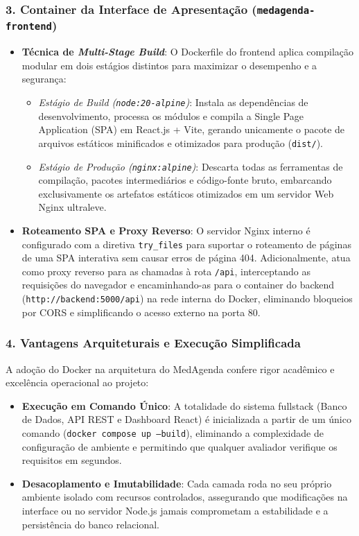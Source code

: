 \subsubsection{3. Container da Interface de Apresentação (\texttt{medagenda-frontend})}
\begin{itemize}
    \item \textbf{Técnica de \textit{Multi-Stage Build}}: O Dockerfile do frontend aplica compilação modular em dois estágios distintos para maximizar o desempenho e a segurança:
    \begin{itemize}
        \item \textit{Estágio de Build (\texttt{node:20-alpine})}: Instala as dependências de desenvolvimento, processa os módulos e compila a Single Page Application (SPA) em React.js + Vite, gerando unicamente o pacote de arquivos estáticos minificados e otimizados para produção (\texttt{dist/}).
        \item \textit{Estágio de Produção (\texttt{nginx:alpine})}: Descarta todas as ferramentas de compilação, pacotes intermediários e código-fonte bruto, embarcando exclusivamente os artefatos estáticos otimizados em um servidor Web Nginx ultraleve.
    \end{itemize}
    \item \textbf{Roteamento SPA e Proxy Reverso}: O servidor Nginx interno é configurado com a diretiva \texttt{try\_files} para suportar o roteamento de páginas de uma SPA interativa sem causar erros de página 404. Adicionalmente, atua como proxy reverso para as chamadas à rota \texttt{/api}, interceptando as requisições do navegador e encaminhando-as para o container do backend (\texttt{http://backend:5000/api}) na rede interna do Docker, eliminando bloqueios por CORS e simplificando o acesso externo na porta 80.
\end{itemize}

\subsubsection{4. Vantagens Arquiteturais e Execução Simplificada}
A adoção do Docker na arquitetura do MedAgenda confere rigor acadêmico e excelência operacional ao projeto:
\begin{itemize}
    \item \textbf{Execução em Comando Único}: A totalidade do sistema fullstack (Banco de Dados, API REST e Dashboard React) é inicializada a partir de um único comando (\texttt{docker compose up --build}), eliminando a complexidade de configuração de ambiente e permitindo que qualquer avaliador verifique os requisitos em segundos.
    \item \textbf{Desacoplamento e Imutabilidade}: Cada camada roda no seu próprio ambiente isolado com recursos controlados, assegurando que modificações na interface ou no servidor Node.js jamais comprometam a estabilidade e a persistência do banco relacional.
\end{itemize}

